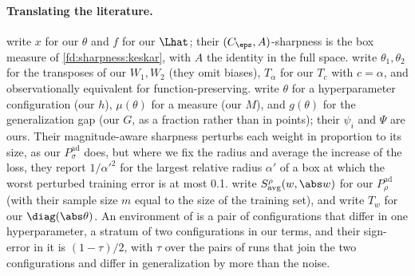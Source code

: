 \begin{refsection}
\paragraph{Translating the literature.} \Textcite{KeskarEtAl2017} write $x$ for our $\theta$ and $f$ for our $\Lhat$; their $(C_\eps,A)$-sharpness is the box measure of \cref{fd:sharpness:keskar}, with $A$ the identity in the full space. \Textcite{DinhEtAl2017} write $\theta_1,\theta_2$ for the transposes of our $W_1,W_2$ (they omit biases), $T_\alpha$ for our $T_c$ with $c=\alpha$, and observationally equivalent for function-preserving. \Textcite{JiangEtAl2020} write $\theta$ for a hyperparameter configuration (our $h$), $\mu(\theta)$ for a measure (our $M$), and $g(\theta)$ for the generalization gap (our $G$, as a fraction rather than in points); their $\psi_i$ and $\Psi$ are ours. Their magnitude-aware sharpness perturbs each weight in proportion to its size, as our $P^{\mathrm{ad}}_\sigma$ does, but where we fix the radius and average the increase of the loss, they report $1/\alpha'^2$ for the largest relative radius $\alpha'$ of a box at which the worst perturbed training error is at most 0.1. \Textcite{AndriushchenkoEtAl2023} write $S^\rho_{\mathrm{avg}}(w,\abs w)$ for our $P^{\mathrm{ad}}_\rho$ (with their sample size $m$ equal to the size of the training set), and \textcite{KwonEtAl2021} write $T_w$ for our $\diag(\abs\theta)$. An environment of \textcite{DziugaiteEtAl2020} is a pair of configurations that differ in one hyperparameter, a stratum of two configurations in our terms, and their sign-error in it is $(1-\tau)/2$, with $\tau$ over the pairs of runs that join the two configurations and differ in generalization by more than the noise.

\printchapterbib
\end{refsection}
